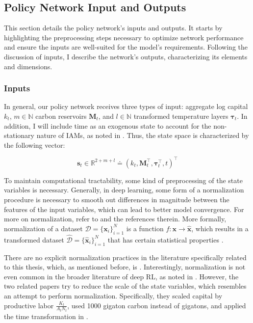 \subsection{Policy Network Input and Outputs}

This section details the policy network's inputs and outputs. It starts by highlighting the preprocessing steps necessary to optimize network performance and ensure the inputs are well-suited for the model's requirements. Following the discussion of inputs, I describe the network's outputs, characterizing its elements and dimensions.


\subsubsection{Inputs}
In general, our policy network receives three types of input: aggregate log capital \(k_t\), \(m\in\mathbb{N}\) carbon reservoirs \(\bm{M}_t\), and \(l \in \mathbb{N}\) transformed temperature layers \(\bm{\tau}_t\). In addition, I will include time as an exogenous state to account for the non-stationary nature of IAMs, as noted in \textcite{Folini2024ClimateInCE}. Thus, the state space is characterized by the following vector:


\begin{equation}
    \bm{s}_t \in \mathbb{R}^{2+m+l} \doteq \left (k_t, \bm{M}_t^\top, \bm{\tau}_t^\top, t \right )^\top 
\end{equation}

To maintain computational tractability, some kind of preprocessing of the state variables is necessary. Generally, in deep learning, some form of a normalization procedure is necessary to smooth out differences in magnitude between the features of the input variables, which can lead to better model convergence. For more on normalization, refer to \textcite{HuangLei2023NTiT} and the references therein. More formally, normalization of a dataset \(\mathcal{D}=\{ \bm{x}_i \}^N_{i=1} \) is a function \(f:\bm{x} \to \bm{\hat x}\), which results in a transformed dataset \(\hat{\mathcal{D}}=\{ \bm{\hat x}_i \}^N_{i=1} \) that has certain statistical properties \parencite[Definition II.1.]{HuangLei2023NTiT}. 

There are no explicit normalization practices in the literature specifically related to this thesis, which, as mentioned before, is \textcite{Folini2024ClimateInCE, friedl2023_deepUQ}. Interestingly, normalization is not even common in the broader literature of deep RL, as noted in \textcite{HuangLei2023NTiT}. However, the two related papers try to reduce the scale of the state variables, which resembles an attempt to perform normalization. Specifically, they scaled capital by productive labor \(\frac{K_t}{A_tN_t}\), used 1000 gigaton carbon instead of gigatons, and applied the time transformation in \textcite{Traeger2014timetrafo}. 

